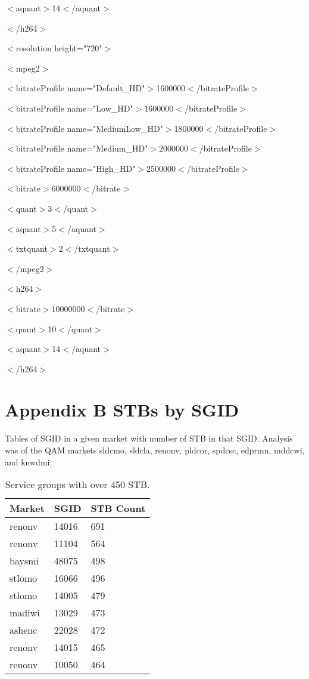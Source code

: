 \documentclass{article}
\begin{document}
$<$aquant$>$14$<$/aquant$>$

$<$/h264$>$
\newline
\newline

$<$resolution height="720"$>$

$<$mpeg2$>$

$<$bitrateProfile name="Default\_HD"$>$1600000$<$/bitrateProfile$>$

$<$bitrateProfile name="Low\_HD"$>$1600000$<$/bitrateProfile$>$

$<$bitrateProfile name="MediumLow\_HD"$>$1800000$<$/bitrateProfile$>$

$<$bitrateProfile name="Medium\_HD"$>$2000000$<$/bitrateProfile$>$

$<$bitrateProfile name="High\_HD"$>$2500000$<$/bitrateProfile$>$

$<$bitrate$>$6000000$<$/bitrate$>$

$<$quant$>$3$<$/quant$>$

$<$aquant$>$5$<$/aquant$>$

$<$txtquant$>$2$<$/txtquant$>$

$<$/mpeg2$>$

$<$h264$>$

$<$bitrate$>$10000000$<$/bitrate$>$

$<$quant$>$10$<$/quant$>$

$<$aquant$>$14$<$/aquant$>$

$<$/h264$>$



\newpage

\section{Appendix B\: STBs by SGID}
\label{APPENDIX-CustBySGID}

Tables of SGID in a given market with number of STB in that SGID. Analysis was of the QAM markets sldcmo, sldcla, renonv, pldcor, spdcsc, edprmn, mddcwi, and knwdmi. 

\begin{table}[h]
\centering
\begin{tabular}{|l|l|l|} 
\hline Market & SGID & STB Count \\
\hline renonv & 14016 & 691 \\  
\hline renonv & 11104 & 564 \\
\hline baysmi & 48075 & 498 \\
\hline stlomo & 16066 & 496 \\
\hline stlomo & 14005 & 479 \\
\hline madiwi & 13029 & 473 \\
\hline ashenc & 22028 & 472 \\
\hline renonv & 14015 & 465 \\
\hline renonv & 10050 & 464 \\
\hline
\end{tabular}
\caption{\label{TABLE-HighSGUse} Service groups with over 450 STB.} 
\end{table}
\end{document}
